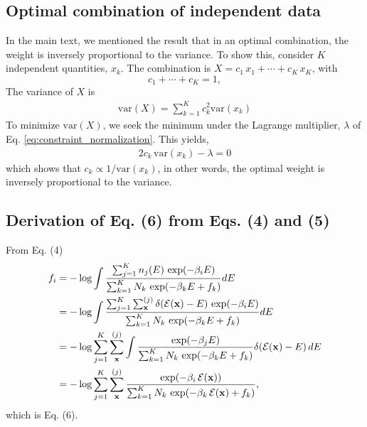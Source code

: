 \documentclass[aip,jcp,preprint,notitlepage, superscriptaddress]{revtex4-1}
\begin{document}
\subsection{Optimal combination of independent data}


In the main text,
we mentioned the result that
in an optimal combination,
the weight is inversely proportional to the variance.
%
To show this,
consider $K$ independent quantities,
$x_k$.
%
The combination is
$X = c_1 \, x_1 + \cdots + c_K \, x_K$,
with
\begin{equation}
  c_1 + \cdots + c_K = 1,
  \label{eq:constraint_normalization}
\end{equation}
%
The variance of $X$ is
%
\begin{align*}
  \mathrm{var}(X)
=
\sum_{k = 1}^K c_k^2 \mathrm{var}(x_k)
\end{align*}
%
To minimize $\mathrm{var}(X)$,
we seek the minimum
under the Lagrange multiplier,
$\lambda$ of Eq. \eqref{eq:constraint_normalization}.
%
This yields,
%
\begin{align*}
  2 c_k \, \mathrm{var}(x_k) - \lambda = 0
\end{align*}
%
which shows that
$c_k \propto 1/\mathrm{var}(x_k)$,
in other words,
the optimal weight
is inversely proportional to the variance.



\subsection{Derivation of Eq. (6) from Eqs. (4) and (5)}



From Eq. (4)
\begin{align*}
f_i
&=
-\log
  \int
    \frac{
      \sum_{j = 1}^K n_j(E) \, \exp(-\beta_i E)
    }
    {
      \sum_{k = 1}^K N_k \, \exp(-\beta_k E + f_k)
    }
    dE
\\
&=
-\log
  \int
    \frac{
      \sum_{j = 1}^K \sum_{\mathbf{x}}^{(j)}
      \delta(\mathcal{E}(\mathbf{x}) - E) \, \exp(-\beta_i E)
    }
    {
      \sum_{k = 1}^K N_k \, \exp(-\beta_k E + f_k)
    }
    dE
\\
&=
-\log
  \sum_{j = 1}^K \sum_{\mathbf{x}}^{(j)}
  \int
    \frac{
      \exp(-\beta_j E)
    }
    {
      \sum_{k = 1}^K N_k \, \exp(-\beta_k E + f_k)
    }
    \delta(\mathcal{E}(\mathbf{x}) - E) \, dE
\\
&=
-\log
  \sum_{j = 1}^K \sum_{\mathbf{x}}^{(j)}
    \frac{
      \exp(-\beta_i \, \mathcal{E}(\mathbf{x}))
    }
    {
      \sum_{k = 1}^K N_k \, \exp(-\beta_k \, \mathcal{E}(\mathbf{x}) + f_k)
    },
\end{align*}
which is Eq. (6).
\end{document}
